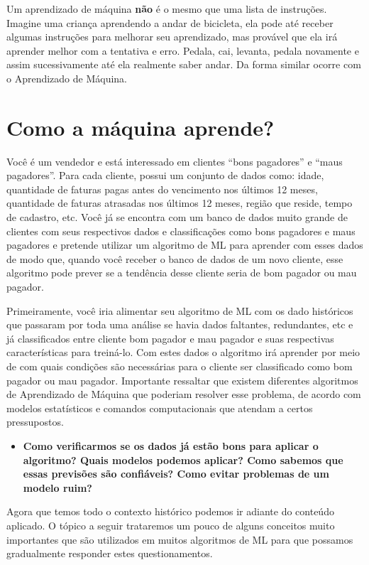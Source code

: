 \documentclass[
  openany]{book}
\providecommand{\tightlist}{%
  \setlength{\itemsep}{0pt}\setlength{\parskip}{0pt}}
\begin{document}
Um aprendizado de máquina \textbf{não} é o mesmo que uma lista de instruções. Imagine uma criança aprendendo a andar de bicicleta, ela pode até receber algumas instruções para melhorar seu aprendizado, mas provável que ela irá aprender melhor com a tentativa e erro. Pedala, cai, levanta, pedala novamente e assim sucessivamente até ela realmente saber andar. Da forma similar ocorre com o Aprendizado de Máquina.

\hypertarget{como-a-muxe1quina-aprende}{%
\section{Como a máquina aprende?}\label{como-a-muxe1quina-aprende}}

Você é um vendedor e está interessado em clientes ``bons pagadores'' e ``maus pagadores''. Para cada cliente, possui um conjunto de dados como: idade, quantidade de faturas pagas antes do vencimento nos últimos 12 meses, quantidade de faturas atrasadas nos últimos 12 meses, região que reside, tempo de cadastro, etc. Você já se encontra com um banco de dados muito grande de clientes com seus respectivos dados e classificações como bons pagadores e maus pagadores e pretende utilizar um algoritmo de ML para aprender com esses dados de modo que, quando você receber o banco de dados de um novo cliente, esse algoritmo pode prever se a tendência desse cliente seria de bom pagador ou mau pagador.

Primeiramente, você iria alimentar seu algoritmo de ML com os dado históricos que passaram por toda uma análise se havia dados faltantes, redundantes, etc e já classificados entre cliente bom pagador e mau pagador e suas respectivas características para treiná-lo. Com estes dados o algoritmo irá aprender por meio de com quais condições são necessárias para o cliente ser classificado como bom pagador ou mau pagador. Importante ressaltar que existem diferentes algoritmos de Aprendizado de Máquina que poderiam resolver esse problema, de acordo com modelos estatísticos e comandos computacionais que atendam a certos pressupostos.

\begin{itemize}
\tightlist
\item
  \textbf{Como verificarmos se os dados já estão bons para aplicar o algoritmo? Quais modelos podemos aplicar? Como sabemos que essas previsões são confiáveis? Como evitar problemas de um modelo ruim?}
\end{itemize}

Agora que temos todo o contexto histórico podemos ir adiante do conteúdo aplicado. O tópico a seguir trataremos um pouco de alguns conceitos muito importantes que são utilizados em muitos algoritmos de ML para que possamos gradualmente responder estes questionamentos.
\end{document}
